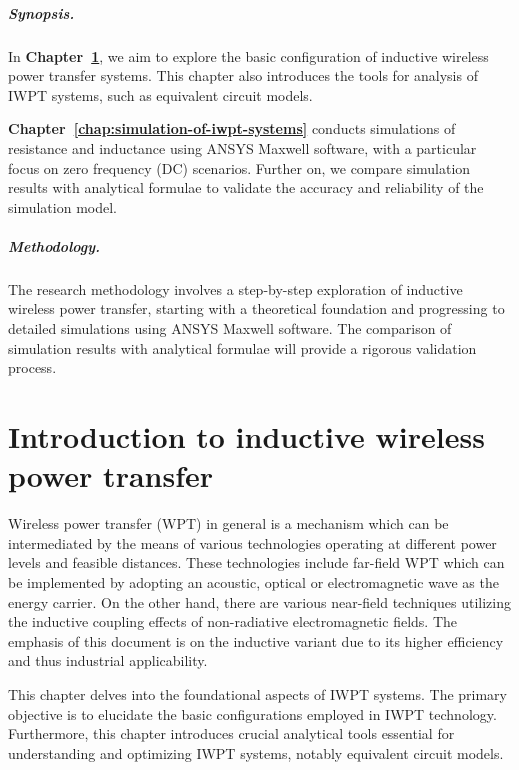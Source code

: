 \documentclass[11pt,a4paper,twoside,openany]{report}
\begin{document}
    \paragraph*{Synopsis.} In \textbf{Chapter~\ref{chap:introduction-to-iwpt}}, we aim to explore the basic configuration of inductive wireless power transfer systems. This chapter also introduces the tools for analysis of IWPT systems, such as equivalent circuit models.

    \textbf{Chapter~\ref{chap:simulation-of-iwpt-systems}} conducts simulations of resistance and inductance using ANSYS Maxwell software, with a particular focus on zero frequency (DC) scenarios. Further on, we compare simulation results with analytical formulae to validate the accuracy and reliability of the simulation model.

    \paragraph*{Methodology.} The research methodology involves a step-by-step exploration of inductive wireless power transfer, starting with a theoretical foundation and progressing to detailed simulations using ANSYS Maxwell software. The comparison of simulation results with analytical formulae will provide a rigorous validation process.


    \chapter{Introduction to inductive wireless power transfer}
    \label{chap:introduction-to-iwpt}

    Wireless power transfer (WPT) in general is a mechanism which can be intermediated by the means of various technologies operating at different power levels and feasible distances. These technologies include far-field WPT which can be implemented by adopting an acoustic, optical or electromagnetic wave as the energy carrier. On the other hand, there are various near-field techniques utilizing the inductive coupling effects of non-radiative electromagnetic fields. The emphasis of this document is on the inductive variant due to its higher efficiency and thus industrial applicability.

    This chapter delves into the foundational aspects of IWPT systems. The primary objective is to elucidate the basic configurations employed in IWPT technology. Furthermore, this chapter introduces crucial analytical tools essential for understanding and optimizing IWPT systems, notably equivalent circuit models.
\end{document}
